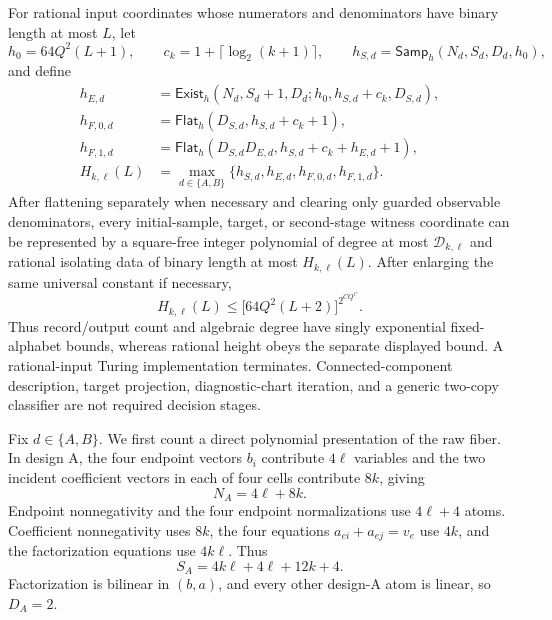 For rational input coordinates whose numerators and denominators have binary length at most \(L\), let
\[
 h_0=64Q^2(L+1),
 \qquad
 c_k=1+\lceil\log_2(k+1)\rceil,
 \qquad
 h_{S,d}=\mathsf{Samp}_h(N_d,S_d,D_d,h_0),
\]
and define
\[
 \begin{aligned}
 h_{E,d}
 &=\mathsf{Exist}_h
   (N_d,S_d+1,D_d;h_0,h_{S,d}+c_k,D_{S,d}),\\
 h_{F,0,d}
 &=\mathsf{Flat}_h(D_{S,d},h_{S,d}+c_k+1),\\
 h_{F,1,d}
 &=\mathsf{Flat}_h
   (D_{S,d}D_{E,d},h_{S,d}+c_k+h_{E,d}+1),\\
 H_{k,\ell}(L)
 &=\max_{d\in\{A,B\}}
   \{h_{S,d},h_{E,d},h_{F,0,d},h_{F,1,d}\}.
 \end{aligned}
\]
After flattening separately when necessary and clearing only guarded observable denominators, every initial-sample, target, or second-stage witness coordinate can be represented by a square-free integer polynomial of degree at most \(\mathcal D_{k,\ell}\) and rational isolating data of binary length at most \(H_{k,\ell}(L)\).  After enlarging the same universal constant if necessary,
\[
 H_{k,\ell}(L)
 \le \bigl[64Q^2(L+2)\bigr]^{2^{CQ^C}}.
\]
Thus record/output count and algebraic degree have singly exponential fixed-alphabet bounds, whereas rational height obeys the separate displayed bound.  A rational-input Turing implementation terminates.  Connected-component description, target projection, diagnostic-chart iteration, and a generic two-copy classifier are not required decision stages.

Fix \(d\in\{A,B\}\).  We first count a direct polynomial presentation of the raw fiber.  In design A, the four endpoint vectors \(b_i\) contribute \(4\ell\) variables and the two incident coefficient vectors in each of four cells contribute \(8k\), giving
\[
 N_A=4\ell+8k.                                             \tag{27}
\]
Endpoint nonnegativity and the four endpoint normalizations use \(4\ell+4\) atoms.  Coefficient nonnegativity uses \(8k\), the four equations \(a_{ei}+a_{ej}=v_e\) use \(4k\), and the factorization equations use \(4k\ell\).  Thus
\[
 S_A=4k\ell+4\ell+12k+4.                                 \tag{28}
\]
Factorization is bilinear in \((b,a)\), and every other design-A atom is linear, so \(D_A=2\).


